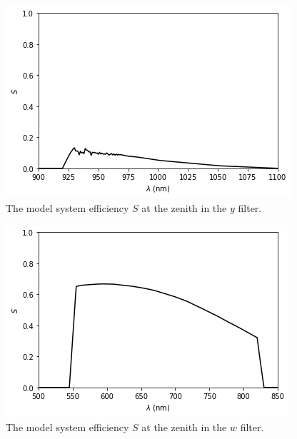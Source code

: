 \begin{figure}
\begin{center}
\includegraphics[width=0.9\linewidth]{figures/huitzi-S-y.png}
\medskip
\caption{The model system efficiency $S$ at the zenith in the $y$ filter.}
\end{center}
\end{figure}

\begin{figure}
\begin{center}
\includegraphics[width=0.9\linewidth]{figures/huitzi-S-w.png}
\medskip
\caption{The model system efficiency $S$ at the zenith in the $w$ filter.}
\end{center}
\end{figure}

